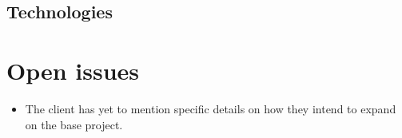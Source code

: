\documentclass[a4paper,12pt]{report}
\begin{document}
	\subsection{Technologies}

\section{Open issues}
	\begin{itemize}
		\item The client has yet to mention specific details on how they intend to expand on the base project.
	\end{itemize}




\end{document}
